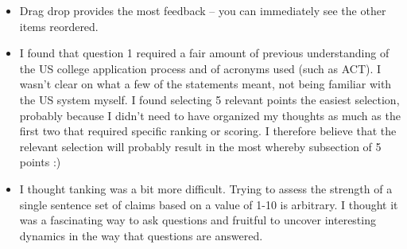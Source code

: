 \documentclass[10pt]{article}
\begin{document}
\begin{itemize}
\item Drag drop provides the most feedback -- you can immediately see the other items reordered. 
\item I found that question 1 required a fair amount of previous understanding of the US college application process and of acronyms used (such as ACT). I wasn't clear on what a few of the statements meant, not being familiar with the US system myself. I found selecting 5 relevant points the easiest selection, probably because I didn't need to have organized my thoughts as much as the first two that required specific ranking or scoring. I therefore believe that the relevant selection will probably result in the most whereby subsection of 5 points :)
\item I thought tanking was a bit more difficult. Trying to assess the strength of a single sentence set of claims based on a value of 1-10 is arbitrary. I thought it was a fascinating way to ask questions and fruitful to uncover interesting dynamics in the way that questions are answered. 
\end{itemize}
\end{document}
